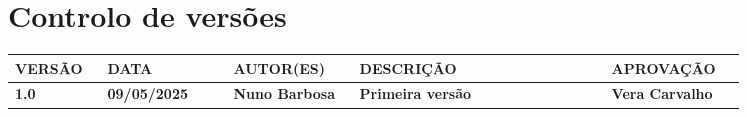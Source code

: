 \setlength{\headheight}{61.22015pt}
\addtolength{\topmargin}{-11.22015pt}

\newpage
\thispagestyle{otherpages}
\vspace*{30pt}
\section*{Controlo de versões}

\small
\begin{tabular}{| >{\centering\arraybackslash}p{0.1\linewidth} | >{\centering\arraybackslash}p{0.15\linewidth} | >{\centering\arraybackslash}p{0.15\linewidth} | >{\centering\arraybackslash}p{0.3\linewidth} | >{\centering\arraybackslash}p{0.15\linewidth} |}
    \hline
    VERSÃO & DATA & AUTOR(ES) & DESCRIÇÃO & APROVAÇÃO \\
    \hline
    \textbf{1.0} & \textbf{09/05/2025} & \textbf{Nuno Barbosa} & \textbf{Primeira versão} & \textbf{Vera Carvalho} \\
    \hline
\end{tabular}